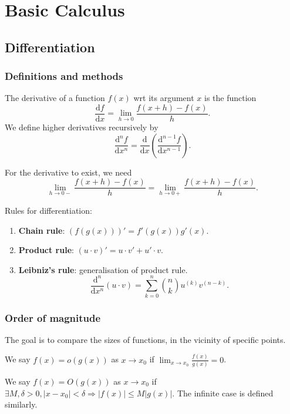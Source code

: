 \documentclass[a4paper]{article}
\begin{document}
	\maketitle
    \tableofcontents
    \section{Basic Calculus}
    \subsection{Differentiation}
    \subsubsection{Definitions and methods}
	\begin{definition}[Derivative]
        The derivative of a function $f(x)$ wrt its argument $x$ is the function
        \[
            \frac{\mathrm{d}f}{\mathrm{d}x} = \lim_{h \to 0} \frac{f(x+h)-f(x)}{h} 
        .\]
        We define higher derivatives recursively by 
        \[
            \frac{\mathrm{d}^nf}{\mathrm{d}x^n} = \frac{\mathrm{d}}{\mathrm{d}x}\left( \frac{\mathrm{d}^{n-1}f}{\mathrm{d}x^{n-1}}  \right)   
        .\]
    \end{definition}
    For the derivative to exist, we need
    \[
        \lim_{h \to 0-} \frac{f(x+h)-f(x)}{h} = \lim_{h \to 0+} \frac{f(x+h)-f(x)}{h} 
    .\]
    
    Rules for differentiation:
    \begin{enumerate}
        \item \textbf{Chain rule}: $ (f(g(x)))' = f'(g(x))g'(x) $.
        \item \textbf{Product rule}: $ (u\cdot v)' = u\cdot v'+u'\cdot v $.
        \item \textbf{Leibniz's rule}: generalisation of product rule.
        \[
            \frac{\mathrm{d}^n}{\mathrm{d}x^n}(u\cdot v) = \sum_{k=0}^{n}\binom{n}{k}u^{(k)}v^{(n-k)}
        .\]
    \end{enumerate}
    \subsubsection{Order of magnitude}
    The goal is to compare the sizes of functions, in the vicinity of specific points.
    \begin{definition}
        We say $ f(x) = o(g(x)) $ as $x\to x_0$ if $ \lim_{x \to x_0} \frac{f(x)}{g(x)} = 0 $.

        We say $ f(x) = O(g(x)) $ as $x\to x_0$ if $ \exists M, \delta>0, \left| x-x_0 \right| <\delta \Rightarrow \left| f(x) \right| \le M \left| g(x) \right| . $ The infinite case is defined similarly.
    \end{definition}
\end{document}
